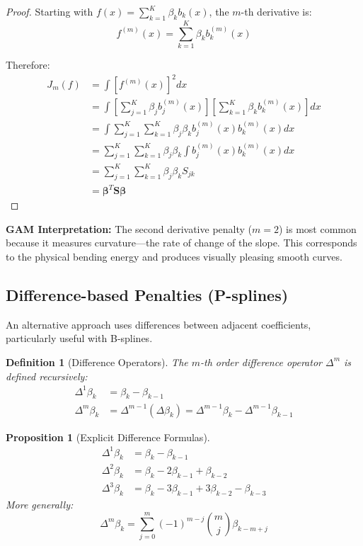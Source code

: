 \documentclass[12pt]{article}
\newtheorem{proposition}[theorem]{Proposition}
\newtheorem{definition}{Definition}
\begin{document}
\begin{proof}
Starting with $f(x) = \sum_{k=1}^K \beta_k b_k(x)$, the $m$-th derivative is:
\begin{equation}
f^{(m)}(x) = \sum_{k=1}^K \beta_k b_k^{(m)}(x)
\end{equation}

Therefore:
\begin{align}
J_m(f) &= \int \left[f^{(m)}(x)\right]^2 dx \\
&= \int \left[\sum_{j=1}^K \beta_j b_j^{(m)}(x)\right] \left[\sum_{k=1}^K \beta_k b_k^{(m)}(x)\right] dx \\
&= \int \sum_{j=1}^K \sum_{k=1}^K \beta_j \beta_k b_j^{(m)}(x) b_k^{(m)}(x) dx \\
&= \sum_{j=1}^K \sum_{k=1}^K \beta_j \beta_k \int b_j^{(m)}(x) b_k^{(m)}(x) dx \\
&= \sum_{j=1}^K \sum_{k=1}^K \beta_j \beta_k S_{jk} \\
&= \bm{\beta}^T \mathbf{S} \bm{\beta}
\end{align}
\end{proof}

\textbf{GAM Interpretation:} The second derivative penalty ($m=2$) is most common because it measures curvature—the rate of change of the slope. This corresponds to the physical bending energy and produces visually pleasing smooth curves.

\subsection{Difference-based Penalties (P-splines)}

An alternative approach uses differences between adjacent coefficients, particularly useful with B-splines.

\begin{definition}[Difference Operators]
The $m$-th order difference operator $\Delta^m$ is defined recursively:
\begin{align}
\Delta^1 \beta_k &= \beta_k - \beta_{k-1} \\
\Delta^m \beta_k &= \Delta^{m-1}(\Delta \beta_k) = \Delta^{m-1} \beta_k - \Delta^{m-1} \beta_{k-1}
\end{align}
\end{definition}

\begin{proposition}[Explicit Difference Formulas]
\begin{align}
\Delta^1 \beta_k &= \beta_k - \beta_{k-1} \\
\Delta^2 \beta_k &= \beta_k - 2\beta_{k-1} + \beta_{k-2} \\
\Delta^3 \beta_k &= \beta_k - 3\beta_{k-1} + 3\beta_{k-2} - \beta_{k-3}
\end{align}
More generally:
\begin{equation}
\Delta^m \beta_k = \sum_{j=0}^m (-1)^{m-j} \binom{m}{j} \beta_{k-m+j}
\end{equation}
\end{proposition}
\end{document}
